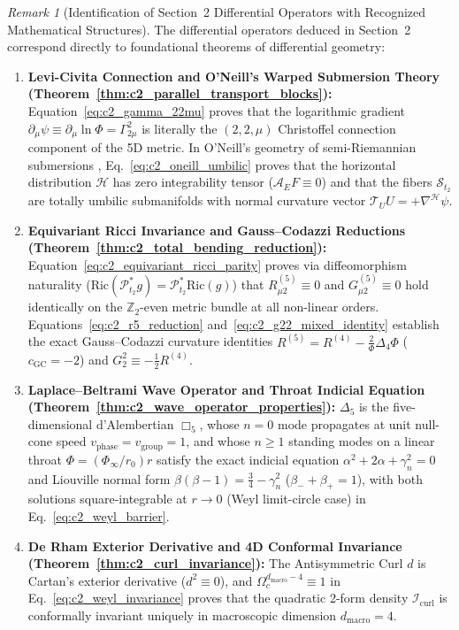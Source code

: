 \documentclass[11pt,a4paper]{article}
\theoremstyle{definition}
\theoremstyle{plain}
\theoremstyle{remark}
\newtheorem{remark}[axiom]{Remark}
\begin{document}
\begin{remark}[Identification of Section~2 Differential Operators with Recognized Mathematical Structures]\label{rem:c2_master_recognition}
The differential operators deduced in Section~2 correspond directly to foundational theorems of differential geometry:
\begin{enumerate}[label=\arabic*.]
  \item \textbf{Levi-Civita Connection and O'Neill's Warped Submersion Theory (Theorem~\ref{thm:c2_parallel_transport_blocks}):} Equation~\eqref{eq:c2_gamma_22mu} proves that the logarithmic gradient $\partial_\mu\psi \equiv \partial_\mu\ln\Phi = \Gamma^2_{2\mu}$ is literally the $(2,2,\mu)$ Christoffel connection component of the 5D metric. In O'Neill's geometry of semi-Riemannian submersions \cite{ONeill1983}, Eq.~\eqref{eq:c2_oneill_umbilic} proves that the horizontal distribution $\mathcal{H}$ has zero integrability tensor ($\mathcal{A}_E F \equiv 0$) and that the fibers $\mathcal{S}_{t_2}$ are totally umbilic submanifolds with normal curvature vector $\mathcal{T}_U U = +\nabla^{\mathcal{H}}\psi$.
  \item \textbf{Equivariant Ricci Invariance and Gauss--Codazzi Reductions (Theorem~\ref{thm:c2_total_bending_reduction}):} Equation~\eqref{eq:c2_equivariant_ricci_parity} proves via diffeomorphism naturality ($\mathrm{Ric}(\mathcal{P}_{t_2}^* g) = \mathcal{P}_{t_2}^*\mathrm{Ric}(g)$) that $R_{\mu 2}^{(5)} \equiv 0$ and $G_{\mu 2}^{(5)} \equiv 0$ hold identically on the $\mathbb{Z}_2$-even metric bundle at all non-linear orders. Equations~\eqref{eq:c2_r5_reduction} and~\eqref{eq:c2_g22_mixed_identity} establish the exact Gauss--Codazzi curvature identities $R^{(5)} = R^{(4)} - \frac{2}{\Phi}\Delta_4\Phi$ ($c_{\mathrm{GC}} = -2$) and $G^2_2 \equiv -\frac{1}{2}R^{(4)}$.
  \item \textbf{Laplace--Beltrami Wave Operator and Throat Indicial Equation (Theorem~\ref{thm:c2_wave_operator_properties}):} $\Delta_5$ is the five-dimensional d'Alembertian $\Box_5$, whose $n = 0$ mode propagates at unit null-cone speed $v_{\mathrm{phase}} = v_{\mathrm{group}} = 1$, and whose $n \ge 1$ standing modes on a linear throat $\Phi = (\Phi_\infty/r_0)r$ satisfy the exact indicial equation $\alpha^2 + 2\alpha + \gamma_n^2 = 0$ and Liouville normal form $\beta(\beta - 1) = \frac{3}{4} - \gamma_n^2$ ($\beta_- + \beta_+ = 1$), with both solutions square-integrable at $r \to 0$ (Weyl limit-circle case) in Eq.~\eqref{eq:c2_weyl_barrier}.
  \item \textbf{De Rham Exterior Derivative and 4D Conformal Invariance (Theorem~\ref{thm:c2_curl_invariance}):} The Antisymmetric Curl $d$ is Cartan's exterior derivative ($d^2 \equiv 0$), and $\Omega_c^{d_{\mathrm{macro}}-4} \equiv 1$ in Eq.~\eqref{eq:c2_weyl_invariance} proves that the quadratic 2-form density $\mathcal{I}_{\mathrm{curl}}$ is conformally invariant uniquely in macroscopic dimension $d_{\mathrm{macro}} = 4$.
\end{enumerate}
\end{remark}
\end{document}
